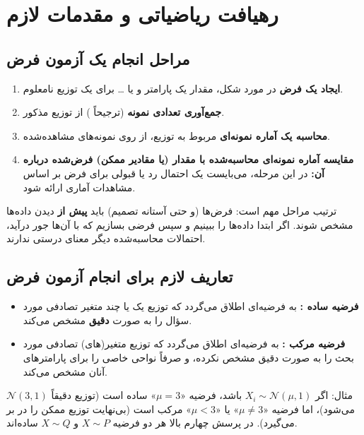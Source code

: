 \section{رهیافت ریاضیاتی و مقدمات لازم}

\subsection{مراحل انجام یک آزمون فرض}
\begin{enumerate}
\item \textbf{ایجاد یک فرض } در مورد شکل، مقدار یک پارامتر و یا \ldots{} برای یک توزیع نامعلوم.
\item \textbf{جمع‌آوری تعدادی نمونه} (ترجیحاً ) از توزیع مذکور.
\item \textbf{محاسبه یک آماره نمونه‌ای } مربوط به توزیع، از روی نمونه‌های مشاهده‌شده.
\item \textbf{مقایسه آماره نمونه‌ای محاسبه‌شده با مقدار (یا مقادیر ممکن) فرض‌شده درباره آن:} در این مرحله، می‌بایست یک احتمال رد یا قبولی برای فرض بر اساس مشاهدات آماری ارائه شود.
\end{enumerate}
ترتیب مراحل مهم است: فرض‌ها (و حتی آستانه تصمیم) باید \textbf{پیش از} دیدن داده‌ها مشخص شوند. اگر ابتدا داده‌ها را ببینیم و سپس فرضی بسازیم که با آن‌ها جور درآید، احتمالات محاسبه‌شده دیگر معنای درستی ندارند.

\subsection{تعاریف لازم برای انجام آزمون فرض}

\begin{definition}
\begin{itemize}
\item \textbf{فرضیه ساده :} به فرضیه‌ای اطلاق می‌گردد که توزیع یک یا چند متغیر تصادفی مورد سؤال را به صورت \textbf{دقیق} مشخص می‌کند.
\item \textbf{فرضیه مرکب :} به فرضیه‌ای اطلاق می‌گردد که توزیع متغیر(های) تصادفی مورد بحث را به صورت دقیق مشخص نکرده، و صرفاً نواحی خاصی را برای پارامترهای آنان مشخص می‌کند.
\end{itemize}
\end{definition}
مثال: اگر $X_i\sim\mathcal N(\mu,1)$ باشد، فرضیه «$\mu=3$» ساده است (توزیع دقیقاً $\mathcal N(3,1)$ می‌شود)، اما فرضیه «$\mu\neq3$» یا «$\mu<3$» مرکب است (بی‌نهایت توزیع ممکن را در بر می‌گیرد). در پرسش چهارم بالا هر دو فرضیه $X\sim P$ و $X\sim Q$ ساده‌اند.

